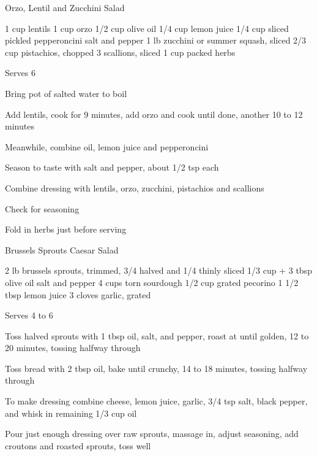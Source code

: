 \begin{denserecipe}{Orzo, Lentil and Zucchini Salad}{}
\begin{ingredients}
1 cup lentils
1 cup orzo
1/2 cup olive oil
1/4 cup lemon juice
1/4 cup sliced pickled pepperoncini
salt and pepper
1 lb zucchini or summer squash, sliced
2/3 cup pistachios, chopped
3 scallions, sliced
1 cup packed herbs
\end{ingredients}
\nextcolumn
Serves 6
\begin{steps}
    \item Bring pot of salted water to boil
    \item Add lentils, cook for 9 minutes, add orzo and cook until done, another 10 to 12 minutes
    \item Meanwhile, combine oil, lemon juice and pepperoncini
    \item Season to taste with salt and pepper, about 1/2 tsp each
    \item Combine dressing with lentils, orzo, zucchini, pistachios and scallions
    \item Check for seasoning
    \item Fold in herbs just before serving
\end{steps}
\end{denserecipe}

\begin{denserecipe}{Brussels Sprouts Caesar Salad}{}
\begin{ingredients}
2 lb brussels sprouts, trimmed, 3/4 halved and 1/4 thinly sliced
1/3 cup + 3 tbsp olive oil
salt and pepper
4 cups torn sourdough
1/2 cup grated pecorino
1 1/2 tbsp lemon juice
3 cloves garlic, grated
\end{ingredients}
\nextcolumn
Serves 4 to 6
\begin{steps}
\item Toss halved sprouts with 1 tbsp oil, salt, and pepper, roast at  until golden, 12 to 20 minutes, tossing halfway through
\item Toss bread with 2 tbsp oil, bake until crunchy, 14 to 18 minutes, tossing halfway through
\item To make dressing combine cheese, lemon juice, garlic, 3/4 tsp salt, black pepper, and whisk in remaining 1/3 cup oil
\item Pour just enough dressing over raw sprouts, massage in, adjust seasoning, add croutons and roasted sprouts, toss well
\end{steps}
\end{denserecipe}

